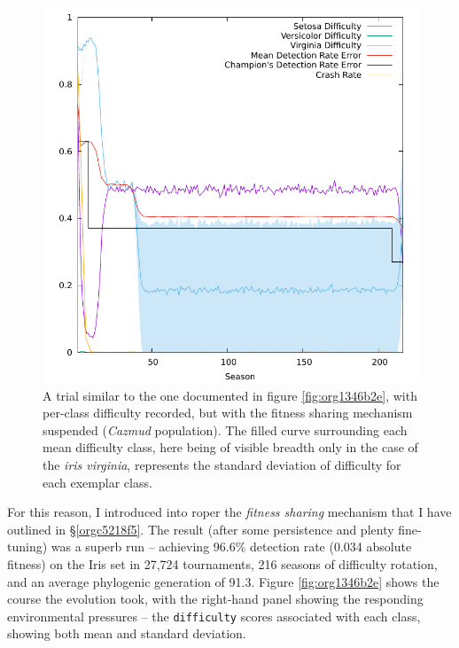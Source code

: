 \documentclass[12pt,glossary]{dalthesis}
\begin{document}
\begin{figure}[htbp]
\centering
\includegraphics[width=.9\linewidth]{../images/plots/nosharing.pdf}
\caption{\label{fig:org54b0f72}
A trial similar to the one documented in figure \ref{fig:org1346b2e}, with per-class difficulty recorded, but with the fitness sharing mechanism suspended (\emph{Cazmud} population). The filled curve surrounding each mean difficulty class, here being of visible breadth only in the case of the \emph{iris virginia}, represents the standard deviation of difficulty for each exemplar class.}
\end{figure}

For this reason, I introduced into \gls{roper} the \emph{fitness sharing} mechanism 
that I have outlined in \S \ref{orgc5218f5}. 
 The result (after some persistence and plenty fine-tuning) was a superb run --
achieving 96.6\% detection rate (0.034 absolute fitness) on the Iris set in
27,724 tournaments, 216 seasons of difficulty rotation, and an average
phylogenic generation of 91.3. Figure \ref{fig:org1346b2e} shows the course the
evolution took, with the right-hand panel showing the responding environmental
pressures -- the \texttt{difficulty} scores associated with each class, showing both
mean and standard deviation.
\end{document}

